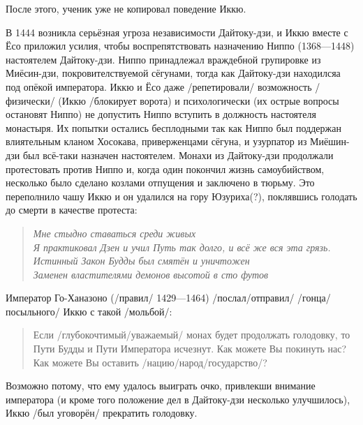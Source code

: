 \begin{ver}
  После этого, ученик уже не копировал поведение Иккю.
\end{ver}

\begin{ver}
  В 1444 возникла серьёзная угроза независимости Дайтоку-дзи, и Иккю
  вместе с Ёсо приложил усилия, чтобы воспрепятствовать назначению
  Ниппо (1368---1448) настоятелем Дайтоку-дзи. Ниппо принадлежал
  враждебной групировке из Миёсин-дзи, покровителствуемой сёгунами,
  тогда как Дайтоку-дзи находилсяа под опёкой императора.  Иккю и Ёсо
  даже /репетировали/ возможность /физически/ (Иккю /блокирует ворота)
  и психологически (их острые вопросы остановят Ниппо) не допустить
  Ниппо вступить в должность настоятеля монастыря. Их попытки остались
  бесплодными так как Ниппо был поддержан влиятельным
  кланом Хосокава, приверженцами сёгуна, и узурпатор из Миёшин-дзи был
  всё-таки назначен настоятелем. Монахи из Дайтоку-дзи продолжали
  протестовать против Ниппо и, когда один покончил жизнь
  самоубийством, несколько было сделано козлами отпущения и заключено
  в тюрьму. Это переполнило чашу Иккю и он удалился на гору
  Юзуриха(?), поклявшись голодать до смерти в качестве протеста:
\end{ver}

\begin{ver}
  \begin{verse}\it
    Мне стыдно ставаться среди живых\\
    Я практиковал Дзен и учил Путь так долго, и всё же вся эта грязь.\\
    Истинный Закон Будды был смятён и уничтожен\\
    Заменен властителями демонов высотой в сто футов
  \end{verse}
\end{ver}

\begin{ver}
  Император Го-Ханазоно (/правил/ 1429---1464)
  /послал/отправил/ /гонца/посыльного/ Иккю с такой /мольбой/:
\end{ver}

\begin{ver}
  \begin{quote}
    Если /глубокочтимый/уважаемый/ монах будет продолжать голодовку,
    то Пути Будды и Пути Императора исчезнут. Как можете
    Вы покинуть нас? Как можете Вы оставить /нацию/народ/государство/?
  \end{quote}
\end{ver}

\begin{ver}
  Возможно потому, что ему удалось выиграть очко, привлекши внимание
  императора (и кроме того положение дел в Дайтоку-дзи несколько
  улучшилось), Иккю /был уговорён/ прекратить голодовку. 
\end{ver}
